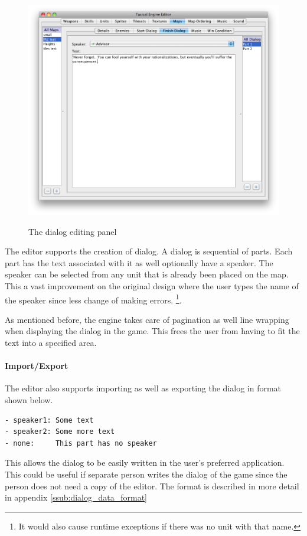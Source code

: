 \begin{figure}[htbp]
		\includegraphics[height=4in]{figures/editor/Maps-dialog.png}
	\caption{The dialog editing panel}
	\label{fig:figures_editor_Maps-dialog}
\end{figure}
The editor supports the creation of dialog.  A dialog is sequential of parts. Each part has the text  associated with it as well optionally have a speaker.  The speaker can be selected from any unit that is already been placed on the map. This a vast improvement on the original design where the user types the name of the speaker since less change of making errors. \footnote{It would also cause runtime exceptions if there was no unit with that name.}.

As mentioned before, the engine takes care of pagination as well line wrapping when displaying the dialog in the game. This frees the user from having to fit the text into a specified area. 

\paragraph{Import/Export\\}
The editor also supports importing as well as exporting the dialog in format shown below. 
\begin{lstlisting}[caption=Shows the format used  for the dialog]
- speaker1: Some text 
- speaker2: Some more text
- none:     This part has no speaker
\end{lstlisting}
This allows the dialog to be easily written in the user's preferred application.  This could be useful if separate person writes the dialog of the game since the person does not need a copy of the editor. The format is described in more detail in appendix \ref{ssub:dialog_data_format}  

